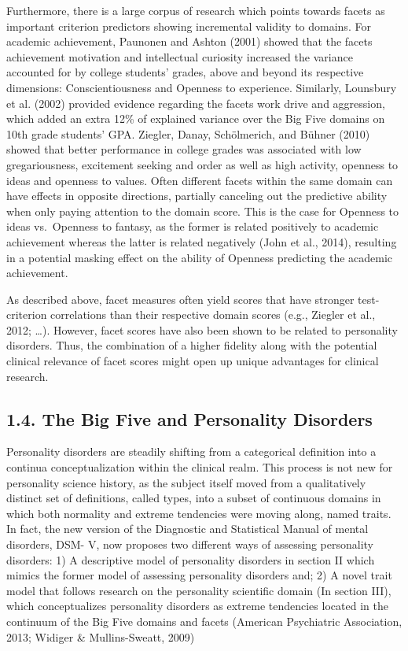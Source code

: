 \documentclass[,man,floatsintext]{apa6}
\theoremstyle{definition}
\theoremstyle{definition}
\theoremstyle{definition}
\theoremstyle{remark}
\begin{document}
Furthermore, there is a large corpus of research which points towards
facets as important criterion predictors showing incremental validity to
domains. For academic achievement, Paunonen and Ashton (2001) showed
that the facets achievement motivation and intellectual curiosity
increased the variance accounted for by college students' grades, above
and beyond its respective dimensions: Conscientiousness and Openness to
experience. Similarly, Lounsbury et al. (2002) provided evidence
regarding the facets work drive and aggression, which added an extra
12\% of explained variance over the Big Five domains on 10th grade
students' GPA. Ziegler, Danay, Schölmerich, and Bühner (2010) showed
that better performance in college grades was associated with low
gregariousness, excitement seeking and order as well as high activity,
openness to ideas and openness to values. Often different facets within
the same domain can have effects in opposite directions, partially
canceling out the predictive ability when only paying attention to the
domain score. This is the case for Openness to ideas vs.~Openness to
fantasy, as the former is related positively to academic achievement
whereas the latter is related negatively (John et al., 2014), resulting
in a potential masking effect on the ability of Openness predicting the
academic achievement.

As described above, facet measures often yield scores that have stronger
test-criterion correlations than their respective domain scores (e.g.,
Ziegler et al., 2012; \ldots{}). However, facet scores have also been
shown to be related to personality disorders. Thus, the combination of a
higher fidelity along with the potential clinical relevance of facet
scores might open up unique advantages for clinical research.

\hypertarget{the-big-five-and-personality-disorders}{%
\subsection{1.4. The Big Five and Personality
Disorders}\label{the-big-five-and-personality-disorders}}

Personality disorders are steadily shifting from a categorical
definition into a continua conceptualization within the clinical realm.
This process is not new for personality science history, as the subject
itself moved from a qualitatively distinct set of definitions, called
types, into a subset of continuous domains in which both normality and
extreme tendencies were moving along, named traits. In fact, the new
version of the Diagnostic and Statistical Manual of mental disorders,
DSM- V, now proposes two different ways of assessing personality
disorders: 1) A descriptive model of personality disorders in section II
which mimics the former model of assessing personality disorders and; 2)
A novel trait model that follows research on the personality scientific
domain (In section III), which conceptualizes personality disorders as
extreme tendencies located in the continuum of the Big Five domains and
facets (American Psychiatric Association, 2013; Widiger \&
Mullins-Sweatt, 2009)
\end{document}
